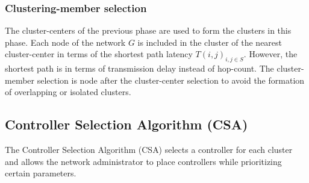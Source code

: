 \documentclass[final,5p,times]{cas-dc}
\begin{document}
	
	\subsubsection{Clustering-member selection}
	The cluster-centers of the previous phase are used to form the clusters in this phase. Each node of the network $G$ is included in the cluster of the nearest cluster-center in terms of the shortest path latency $T(i,j)_{i,j \in S}$. However, the shortest path is in terms of transmission delay instead of hop-count. The cluster-member selection is node after the cluster-center selection to avoid the formation of overlapping or isolated clusters.
	
	
	\subsection{Controller Selection Algorithm (CSA)} \label{csa}
	
	The Controller Selection Algorithm (CSA) selects a controller for each cluster and allows the network administrator to place controllers while prioritizing certain parameters.
	
\end{document}
